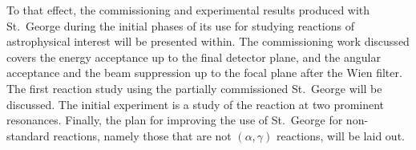 To that effect, the commissioning and experimental results produced with
St.\ George during the initial phases of its use for studying reactions
of astrophysical interest will be presented within. The commissioning
work discussed covers the energy acceptance up to the final detector
plane, and the angular acceptance and the beam suppression up to the
focal plane after the Wien filter. The first reaction study using the
partially commissioned St.\ George will be discussed. The initial
experiment is a study of the \alpa{} reaction at two prominent
resonances. Finally, the plan for improving the use of St.\ George for
non-standard reactions, namely those that are not $(\alpha,\gamma)$
reactions, will be laid out.
